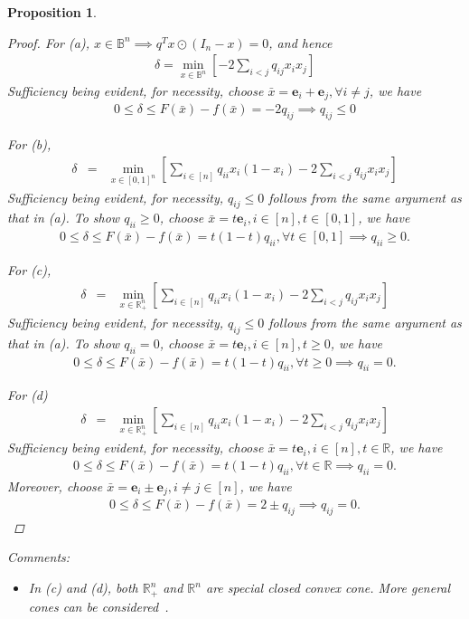 \documentclass[11pt]{article}\usepackage[]{graphicx}\usepackage[]{xcolor}
\newtheorem{prop}{Proposition}
\begin{document}
\begin{prop}
\begin{enumerate}[(i)]
\begin{proof}
For (a), $x\in\mathbb{B}^n\implies q^Tx\odot (I_n-x)=0$, and hence
\begin{eqnarray*}
\delta=\min_{x\in\mathbb{B}^n}\left[-2\sum_{i<j}q_{ij}x_ix_j\right]
\end{eqnarray*}
Sufficiency being evident, for necessity, choose $\bar{x}=\mathbf{e}_i+\mathbf{e}_j, \forall i\ne j$, we have
\begin{eqnarray*}
0\le \delta\le F(\bar{x})-f(\bar{x})=-2q_{ij}\implies q_{ij}\le 0
\end{eqnarray*}


For (b), 
\begin{eqnarray*}
\delta&=&\min_{x\in [0,1]^n}\left[\sum_{i\in [n]}q_{ii}x_i(1-x_i)-2\sum_{i<j}q_{ij}x_ix_j\right]
\end{eqnarray*}
Sufficiency being evident, for necessity, $q_{ij}\le 0$ follows from the same argument as that in (a). To show $q_{ii}\ge 0$, choose $\bar{x}=t\mathbf{e}_i, i\in [n], t\in [0,1]$, we have 
\begin{eqnarray*}
0\le \delta \le F(\bar{x})-f(\bar{x})=t(1-t)q_{ii}, \forall t\in [0,1]\implies q_{ii}\ge 0.
\end{eqnarray*}



For (c), 
\begin{eqnarray*}
\delta&=&\min_{x\in \mathbb{R}^n_{+}}\left[\sum_{i\in [n]}q_{ii}x_i(1-x_i)-2\sum_{i<j}q_{ij}x_ix_j\right]
\end{eqnarray*}
Sufficiency being evident, for necessity, $q_{ij}\le 0$ follows from the same argument as that in (a). To show $q_{ii}=0$, choose $\bar{x}=t\mathbf{e}_i, i\in [n], t\ge 0$, we have 
\begin{eqnarray*}
0\le \delta \le F(\bar{x})-f(\bar{x})=t(1-t)q_{ii}, \forall t\ge 0\implies q_{ii}= 0.
\end{eqnarray*}

For (d)
\begin{eqnarray*}
\delta&=&\min_{x\in \mathbb{R}^n_{+}}\left[\sum_{i\in [n]}q_{ii}x_i(1-x_i)-2\sum_{i<j}q_{ij}x_ix_j\right]
\end{eqnarray*}
Sufficiency being evident, for necessity, choose $\bar{x}=t\mathbf{e}_i, i\in [n], t\in\mathbb{R}$, we have 
\begin{eqnarray*}
0\le \delta \le F(\bar{x})-f(\bar{x})=t(1-t)q_{ii}, \forall t\in\mathbb{R}\implies q_{ii}= 0.
\end{eqnarray*}
Moreover, choose $\bar{x}=\mathbf{e}_i\pm\mathbf{e}_j, i\ne j\in [n]$, we have
\begin{eqnarray*}
0\le \delta \le F(\bar{x})-f(\bar{x})=2\pm q_{ij} \implies q_{ij}= 0.
\end{eqnarray*}
\end{proof}
Comments:
\begin{itemize}
\item In (c) and (d), both $\mathbb{R}^n_{+}$ and $\mathbb{R}^n$ are special closed convex cone. More general cones can be considered~\citep{hiriart2010variational}.
\end{itemize}


\end{enumerate}
\end{prop}
\end{document}
